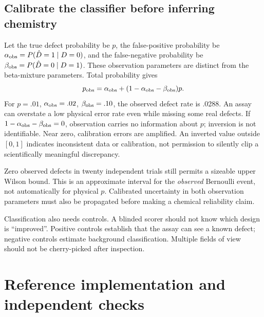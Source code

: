 \subsection{Calibrate the classifier before inferring chemistry}
Let the true defect probability be $p$, the false-positive probability be
$\alpha_{\rm obs}=P(\hat D=1\mid D=0)$, and the false-negative probability be
$\beta_{\rm obs}=P(\hat D=0\mid D=1)$. These observation parameters are distinct
from the beta-mixture parameters. Total probability gives
\begin{equation}
p_{\rm obs}=\alpha_{\rm obs}
 +(1-\alpha_{\rm obs}-\beta_{\rm obs})p.
\label{dnad23:measurement}
\end{equation}
For $p=.01$, $\alpha_{\rm obs}=.02$, $\beta_{\rm obs}=.10$, the observed
defect rate is .0288. An assay can overstate a low physical error rate even
while missing some real defects.
If $1-\alpha_{\rm obs}-\beta_{\rm obs}=0$, observation carries no information
about $p$; inversion is not identifiable. Near zero, calibration errors are amplified.
An inverted value outside $[0,1]$ indicates inconsistent data or calibration,
not permission to silently clip a scientifically meaningful discrepancy.

\begin{center}\end{center}
Zero observed defects in twenty independent trials still permits a sizeable upper
Wilson bound. This is an approximate interval for the \emph{observed} Bernoulli
event, not automatically for physical $p$. Calibrated uncertainty in both observation
parameters must also be propagated before making a chemical reliability claim.

Classification also needs controls. A blinded scorer should not know which design
is ``improved''. Positive controls establish that the assay can see a known defect;
negative controls estimate background classification. Multiple fields of view
should not be cherry-picked after inspection.


\section{Reference implementation and independent checks}

